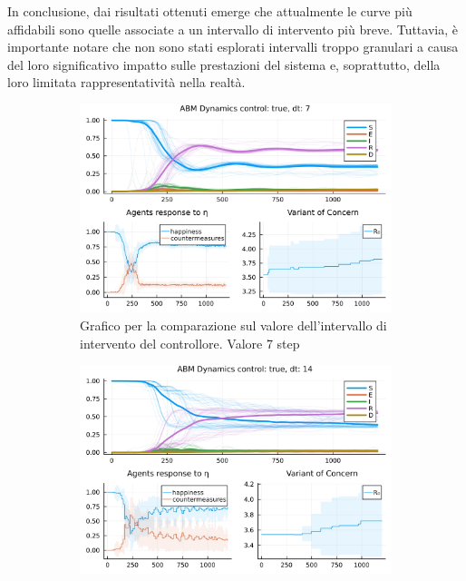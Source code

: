 In conclusione, dai risultati ottenuti emerge che attualmente le curve 
più affidabili sono quelle associate a un intervallo di intervento più 
breve. Tuttavia, è importante notare che non sono stati esplorati 
intervalli troppo granulari a causa del loro significativo impatto 
sulle prestazioni del sistema e, soprattutto, della loro limitata 
rappresentatività nella realtà.

\begin{figure}[!hb]
	\centering
	\begin{subfigure}[b]{0.45\textwidth}
		\centering
		\includegraphics[width=\textwidth]{img/SocialNetworkABM_1_DT.jpg}
		\caption{Grafico per la comparazione sul valore dell'intervallo di intervento del controllore. Valore 7 step}
		\label{fig:comparison_dt_7}
	\end{subfigure}
	\hfill
	\begin{subfigure}[b]{0.45\textwidth}
		\centering
		\includegraphics[width=\textwidth]{img/SocialNetworkABM_2_DT.jpg}

\end{subfigure}
\end{figure}
